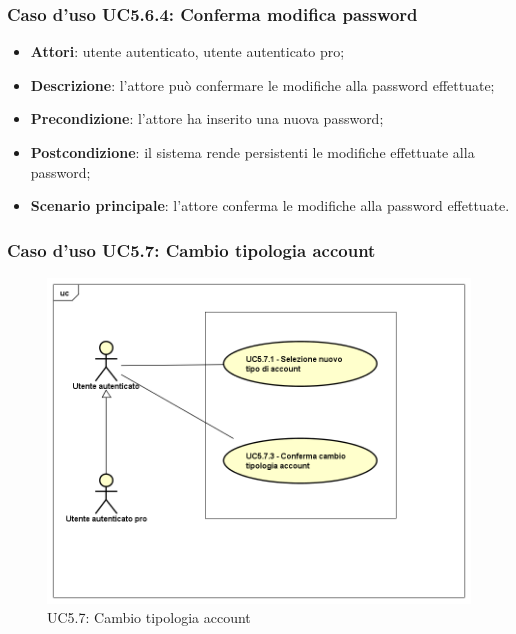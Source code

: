 \subsubsection{Caso d'uso UC5.6.4: Conferma modifica password}

\begin{itemize}
	\item \textbf{Attori}: utente autenticato, utente autenticato pro;
	\item \textbf{Descrizione}: l'attore può confermare le modifiche alla password effettuate;
	\item \textbf{Precondizione}: l'attore ha inserito una nuova password;
	\item \textbf{Postcondizione}: il sistema rende persistenti le modifiche effettuate alla password;
	\item \textbf{Scenario principale}: l'attore conferma le modifiche alla password effettuate.
\end{itemize}

\subsubsection{Caso d'uso UC5.7: Cambio tipologia account}
\label{UC5.7}
\begin{figure}[h]
	\centering
	\includegraphics[scale=0.5,keepaspectratio]{UML/UC5_7.png}
	\caption{UC5.7: Cambio tipologia account}
\end{figure}

